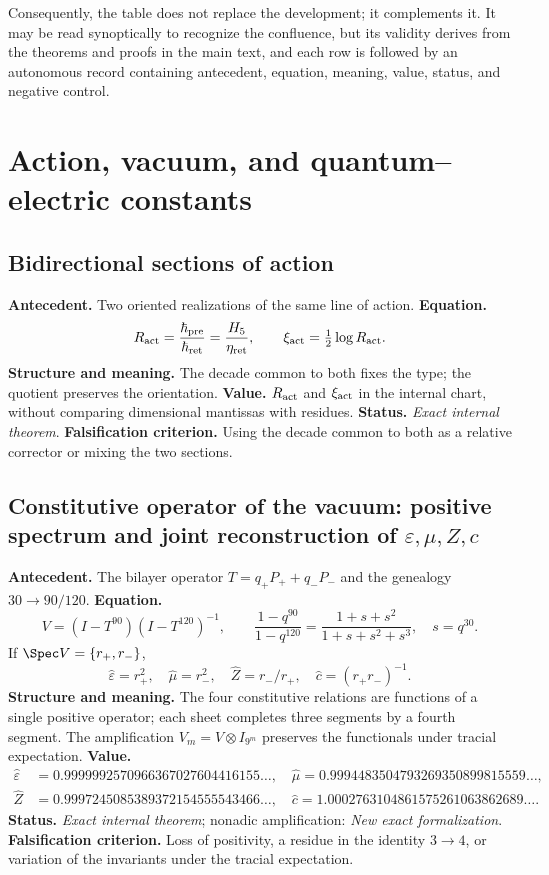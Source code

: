 Consequently, the table does not replace the development; it complements it. It may be read synoptically to recognize the confluence, but its validity derives from the theorems and proofs in the main text, and each row is followed by an autonomous record containing antecedent, equation, meaning, value, status, and negative control.

\section{Action, vacuum, and quantum--electric constants}

\subsection*{Bidirectional sections of action }
\textbf{Antecedent.} Two oriented realizations of the same line of action. \textbf{Equation.}
\[
R_{\rm act}=\frac{\hbar_{\rm pre}}{\hbar_{\rm ret}}
=\frac{H_5}{\eta_{\rm ret}},
\qquad \xi_{\rm act}=\tfrac12\log R_{\rm act}.
\]
\textbf{Structure and meaning.} The decade common to both fixes the type; the quotient
preserves the orientation. \textbf{Value.} \(R_{\rm act}\) and
\(\xi_{\rm act}\) in the internal chart, without comparing dimensional mantissas with
residues. \textbf{Status.} \emph{Exact internal theorem}.
\textbf{Falsification criterion.} Using the decade common to both as a relative corrector or mixing
the two sections.

\subsection*{Constitutive operator of the vacuum: positive spectrum and joint
reconstruction of \(\varepsilon,\mu,Z,c\)}
\textbf{Antecedent.} The bilayer operator \(T=q_+P_++q_-P_-\) and the genealogy
\(30\to90/120\). \textbf{Equation.}
\[
V=(I-T^{90})(I-T^{120})^{-1},
\qquad
\frac{1-q^{90}}{1-q^{120}}
=\frac{1+s+s^2}{1+s+s^2+s^3},\quad s=q^{30}.
\]
If \(\Spec V=\{r_+,r_-\}\),
\[
\widehat\varepsilon=r_+^2,
\quad\widehat\mu=r_-^2,
\quad\widehat Z=r_-/r_+,
\quad\widehat c=(r_+r_-)^{-1}.
\]
\textbf{Structure and meaning.} The four constitutive relations are functions of
a single positive operator; each sheet completes three segments by a fourth segment.
The amplification \(V_m=V\otimes I_{9^m}\) preserves the functionals under
tracial expectation.
\textbf{Value.}
\begin{align*}
\widehat\varepsilon&=0.9999992570966367027604416155\ldots,\quad
\widehat\mu=0.9994483504793269350899815559\ldots,\\
\widehat Z&=0.9997245085389372154555543466\ldots,\quad
\widehat c=1.0002763104861575261063862689\ldots.
\end{align*}
\textbf{Status.} \emph{Exact internal theorem}; nonadic amplification:
\emph{New exact formalization}. \textbf{Falsification criterion.} Loss of
positivity, a residue in the identity \(3\to4\), or variation of the
invariants under the tracial expectation.

